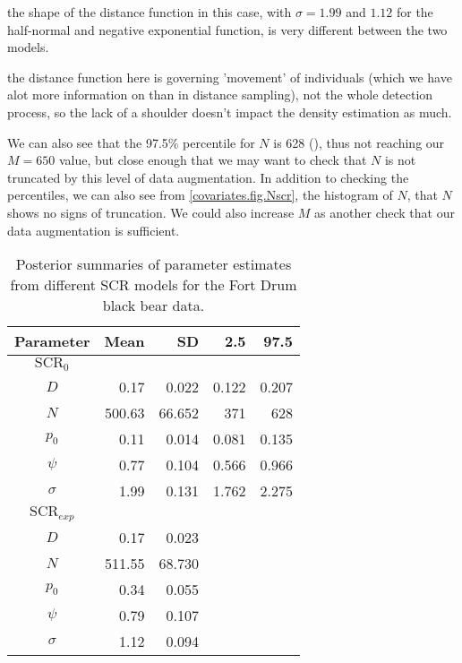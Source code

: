 the shape of the distance function in this case, with $\sigma = 1.99$ and $1.12$ for the 
half-normal and negative exponential function, is very different between
the two models.  

the distance function here is governing 'movement' of individuals (which we have alot more information on than in distance sampling), not the whole detection process, so the lack of a shoulder doesn't impact the density estimation as much.   

We can also see that the 97.5\%
percentile for $N$ is 628 (\label{covariates.tab.SCR0exp}), thus not reaching our $M=650$ value, but
close enough that we may want to check that $N$ is not truncated by
this level of data augmentation.  In addition to checking the percentiles, 
we can also see from \ref{covariates.fig.Nscr}, the histogram of $N$, that $N$ 
shows no signs of truncation.  We could also increase
$M$ as another check that our data augmentation is sufficient.  

\begin{table}[ht]
\centering
\caption{Posterior summaries of parameter estimates from different SCR models for the Fort Drum black bear data.}
\begin{tabular}{crrrr}
\hline \hline
Parameter & Mean & SD & 2.5 & 97.5 \\
\hline

$\mbox{SCR}_0$&   &      &           &        \\
\hline
$D$    &   0.17   & 0.022     &  0.122 & 0.207  \\
$N$    &  500.63 & 66.652  & 371   & 628       \\
$p_0$  &    0.11  & 0.014   & 0.081& 0.135     \\
$\psi$  &   0.77  & 0.104    & 0.566 & 0.966    \\
$\sigma$ &  1.99 & 0.131  &1.762 & 2.275     \\

$\mbox{SCR}_{exp}$&   &      &          &        \\
\hline
$D$  &   0.17 &  0.023  &				& 		 \\
$N$   &  511.55 &  68.730  &			& 		 \\
$p_0$  &    0.34 &   0.055  &			& 		 \\
$\psi$  &   0.79  &  0.107  &			& 		 \\
$\sigma$ &  1.12  & 0.094  &			& 		 \\
\end{tabular}
\label{covariates.tab.SCR0exp}
\end{table}

